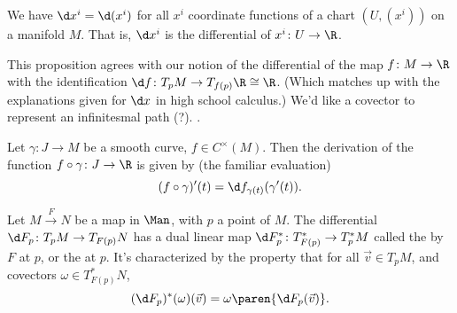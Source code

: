\begin{prop}
   We have $\d x^i = \d (x^i)$ for all $x^i$ coordinate functions of a chart $(U, (x^i))$ on a manifold $M$. That is, $\d x^i$ is the differential of $x^i \colon U \to \R$.
\end{prop}

\begin{note}[]
   This proposition agrees with our notion of the differential of the map $f \colon M \to \R$ with the identification $\d f \colon T_p M \to T_{f(p)} \R \cong \R$. (Which matches up with the explanations given for $\d x$ in high school calculus.) We'd like a covector to represent an infinitesmal path (?). \TODO.
\end{note}

\begin{prop}[]
   Let $\gamma \colon J \to M$ be a smooth curve, $f \in C^\times(M)$. Then the derivation of the function $f \circ \gamma \colon J \to \R$ is given by (the familiar evaluation)
   \[
      (f \circ \gamma) ' (t) = \d f_{\gamma(t)} (\gamma'(t)).
   \]
\end{prop}

\begin{defn}
   Let $M \xrightarrow{F} N$ be a map in $\Man$, with $p$ a point of $M$. The differential $\d F_p \colon T_p M \to T_{F(p)} N$ has a dual linear map $\d F^*_p \colon T^*_{F(p)} \to T^*_p M$ called the  by $F$ at $p$, or the  at $p$. It's characterized by the property that for all $\vec v \in T_p M$, and covectors $\omega \in T^*_{F(p)} N$,
   \[
      (\d F_p)^*(\omega)(\vec v) = \omega \paren{\d F_p(\vec v)}.
   \]
\end{defn}
